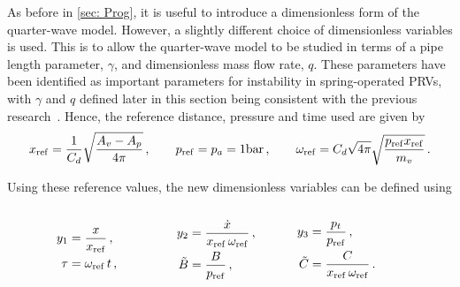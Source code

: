 As before in \cref{sec: Prog}, it is useful to introduce a dimensionless form of the quarter-wave model. However, a slightly different choice of dimensionless variables is used. This is to allow the quarter-wave model to be studied in terms of a pipe length parameter, $\gamma$, and dimensionless mass flow rate, $q$. These parameters have been identified as important parameters for instability in spring-operated PRVs, with $\gamma$ and $q$ defined later in this section being consistent with the previous research~\cite{Hos2016DynamicService}. Hence, the reference distance, pressure and time used are given by
~
\begin{equation*}
\begin{split}
    x_{\rm{ref}} = \frac{1}{C_d} \sqrt{\frac{A_v - A_p}{4 \pi}}
    \, , \qquad
    p_{\rm{ref}} = p_a = 1 \si{bar}
    \, , \qquad
    \omega_{\rm{ref}} = C_d \sqrt{4 \pi} \sqrt{\frac{p_{\rm{ref}} x_{\rm{ref}}}{m_v}} \, .
\end{split}
\end{equation*}

Using these reference values, the new dimensionless variables can be defined using
~
\begin{equation*}
\begin{tabular}{p{3cm} p{3cm} p{3cm}}
    $ \begin{aligned}
        y_1 &= \frac{x}{x_{\rm{ref}}} \, , \\
        \tau &= \omega_{\rm{ref}} \, t \, ,
    \end{aligned} $ &
    $ \begin{aligned}
        y_2 &= \frac{\dot{x}}{x_{\rm{ref}} \, \omega_{\rm{ref}}} \, , \\
        \tilde{B} &= \frac{B}{p_{\rm{ref}}} \, ,
    \end{aligned} $ &
    $ \begin{aligned}
        y_3 &= \frac{p_t}{p_{\rm{ref}}} \, , \\
        \tilde{C} &= \frac{C}{x_{\rm{ref}} \, \omega_{\rm{ref}}} \, .
    \end{aligned} $
\end{tabular}
\end{equation*}

